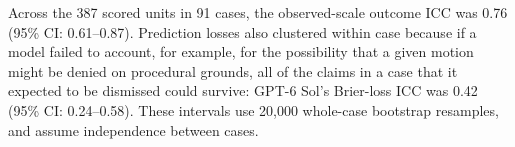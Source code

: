 Across the 387 scored units in 91 cases, the observed-scale outcome ICC was 0.76 (95\% CI: 0.61--0.87). Prediction losses also clustered within case because if a model failed to account, for example, for the possibility that a given motion might be denied on procedural grounds, all of the claims in a case that it expected to be dismissed could survive: GPT-6 Sol's Brier-loss ICC was 0.42 (95\% CI: 0.24--0.58). These intervals use 20,000 whole-case bootstrap resamples, and assume independence between cases.
